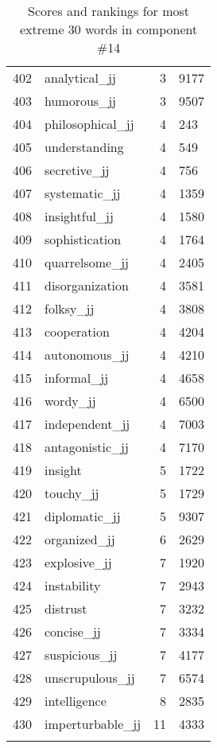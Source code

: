 \begin{longtable}[!htbp]{| rlr@{.}l |}
    402 & analytical\_jj & 3 & 9177 \\
    403 & humorous\_jj & 3 & 9507 \\
    404 & philosophical\_jj & 4 & 243 \\
    405 & understanding & 4 & 549 \\
    406 & secretive\_jj & 4 & 756 \\
    407 & systematic\_jj & 4 & 1359 \\
    408 & insightful\_jj & 4 & 1580 \\
    409 & sophistication & 4 & 1764 \\
    410 & quarrelsome\_jj & 4 & 2405 \\
    411 & disorganization & 4 & 3581 \\
    412 & folksy\_jj & 4 & 3808 \\
    413 & cooperation & 4 & 4204 \\
    414 & autonomous\_jj & 4 & 4210 \\
    415 & informal\_jj & 4 & 4658 \\
    416 & wordy\_jj & 4 & 6500 \\
    417 & independent\_jj & 4 & 7003 \\
    418 & antagonistic\_jj & 4 & 7170 \\
    419 & insight & 5 & 1722 \\
    420 & touchy\_jj & 5 & 1729 \\
    421 & diplomatic\_jj & 5 & 9307 \\
    422 & organized\_jj & 6 & 2629 \\
    423 & explosive\_jj & 7 & 1920 \\
    424 & instability & 7 & 2943 \\
    425 & distrust & 7 & 3232 \\
    426 & concise\_jj & 7 & 3334 \\
    427 & suspicious\_jj & 7 & 4177 \\
    428 & unscrupulous\_jj & 7 & 6574 \\
    429 & intelligence & 8 & 2835 \\
    430 & imperturbable\_jj & 11 & 4333 \\
    \hline
    \caption{Scores and rankings for most extreme 30 words in component \#14} \\
\end{longtable}
